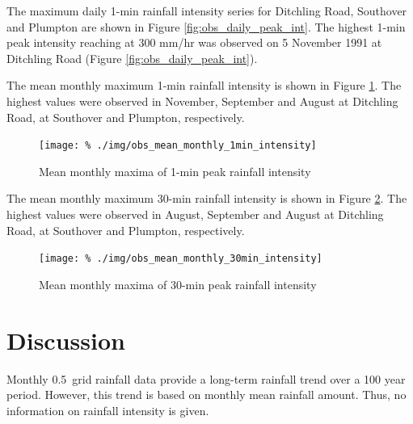 The maximum daily 1-min rainfall intensity series for Ditchling Road, Southover
and Plumpton are shown in Figure \ref{fig:obs_daily_peak_int}. The highest 1-min
peak intensity reaching at 300 mm/hr was observed on 5 November 1991 at
Ditchling Road (Figure \ref{fig:obs_daily_peak_int}).

The mean monthly maximum 1-min rainfall intensity is shown in Figure
\ref{fig:obs_mean_monthly_1min_intensity}. The highest values were observed in
November, September and August at Ditchling Road, at Southover and Plumpton,
respectively.

\begin{figure}
  \centering
  \texttt{[image: \%
./img/obs\_mean\_monthly\_1min\_intensity]}
  \caption{Mean monthly maxima of 1-min peak rainfall intensity}
  \label{fig:obs_mean_monthly_1min_intensity}
\end{figure}

The mean monthly maximum 30-min rainfall intensity is shown in Figure
\ref{fig:obs_mean_monthly_30min_intensity}. The highest values were observed in
August, September and August at Ditchling Road, at Southover and Plumpton,
respectively.

\begin{figure}[htbp]
  \centering
  \texttt{[image: \%
./img/obs\_mean\_monthly\_30min\_intensity]}
  \caption{Mean monthly maxima of 30-min peak rainfall intensity}
  \label{fig:obs_mean_monthly_30min_intensity}
\end{figure}

\section{Discussion}
\label{sec:ObservedRainfallIntensityTrendsDiscussion}


Monthly 0.5\textdegree\ grid rainfall data provide a long-term rainfall trend
over a 100 year period. However, this trend is based on monthly mean rainfall
amount. Thus, no information on rainfall intensity is given.

